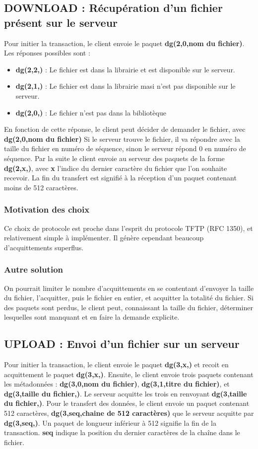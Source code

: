\documentclass[10pt,a4paper]{article}
\begin{document}
\subsection{DOWNLOAD : Récupération d'un fichier présent sur le serveur}
Pour initier la transaction, le client envoie le paquet \textbf{dg(2,0,nom du fichier)}.
Les réponses possibles sont :
\begin{itemize}
 \item \textbf{dg(2,2,)} : Le fichier est dans la librairie et est disponible sur le serveur.
 \item \textbf{dg(2,1,)} : Le fichier est dans la librairie masi n'est pas disponible sur le serveur.
 \item \textbf{dg(2,0,)} : Le fichier n'est pas dans la bibliotèque
\end{itemize}

En fonction de cette réponse, le client peut décider de demander le fichier, avec \textbf{dg(2,0,nom du fichier)}
Si le serveur trouve le fichier, il va répondre avec la taille du fichier en numéro de séquence, sinon le serveur répond 0 en numéro de séquence.
Par la suite le client envoie au serveur des paquets de la forme \textbf{dg(2,x,)}, avec \textbf{x} l'indice du dernier caractère du fichier que l'on souhaite recevoir.
La fin du transfert est signifié à la réception d'un paquet contenant moins de 512 caractères.

\subsubsection{Motivation des choix}
Ce choix de protocole est proche dans l'esprit du protocole TFTP (RFC 1350), et relativement simple à implémenter. Il génère cependant beaucoup d'acquittements superflus.
\subsubsection{Autre solution}
On pourrait limiter le nombre d'acquittements en se contentant d'envoyer la taille du fichier, l'acquitter, puis le fichier en entier, et acquitter la totalité du fichier. Si des paquets sont perdus, le client peut, connaissant la taille du fichier, déterminer lesquelles sont manquant et en faire la demande explicite.


\subsection{UPLOAD : Envoi d'un fichier sur un serveur}
Pour initier la transaction, le client envoie le paquet \textbf{dg(3,x,)} et recoit en acquittement le paquet \textbf{dg(3,x,)}.
Ensuite, le client envoie trois paquets contenant les métadonnées : \textbf{dg(3,0,nom du fichier)}, \textbf{dg(3,1,titre du fichier)}, et \textbf{dg(3,taille du fichier,)}. Le serveur acquitte les trois en renvoyant \textbf{dg(3,taille du fichier,)}.
Pour le transfert des données, le client envoie un paquet contenant 512 caractères, \textbf{dg(3,seq,chaine de 512 caractères)} que le serveur acquitte par \textbf{dg(3,seq,)}.
Un paquet de longueur inférieur à 512 signifie la fin de la transaction. \textbf{seq} indique la position du dernier caractères de la chaîne dans le fichier.
\end{document}
